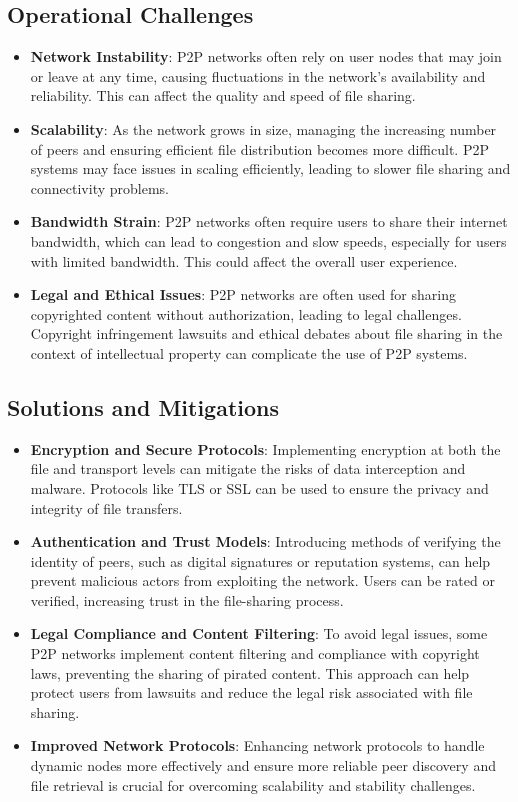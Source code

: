 \subsection{Operational Challenges}

\begin{itemize}
    \item \textbf{Network Instability}: P2P networks often rely on user nodes that may join or leave at any time, causing fluctuations in the network’s availability and reliability. This can affect the quality and speed of file sharing.
    \item \textbf{Scalability}: As the network grows in size, managing the increasing number of peers and ensuring efficient file distribution becomes more difficult. P2P systems may face issues in scaling efficiently, leading to slower file sharing and connectivity problems.
    \item \textbf{Bandwidth Strain}: P2P networks often require users to share their internet bandwidth, which can lead to congestion and slow speeds, especially for users with limited bandwidth. This could affect the overall user experience.
    \item \textbf{Legal and Ethical Issues}: P2P networks are often used for sharing copyrighted content without authorization, leading to legal challenges. Copyright infringement lawsuits and ethical debates about file sharing in the context of intellectual property can complicate the use of P2P systems.
\end{itemize}

\subsection{Solutions and Mitigations}
\begin{itemize}
    \item \textbf{Encryption and Secure Protocols}: Implementing encryption at both the file and transport levels can mitigate the risks of data interception and malware. Protocols like TLS or SSL can be used to ensure the privacy and integrity of file transfers.
    \item \textbf{Authentication and Trust Models}: Introducing methods of verifying the identity of peers, such as digital signatures or reputation systems, can help prevent malicious actors from exploiting the network. Users can be rated or verified, increasing trust in the file-sharing process.
    \item \textbf{Legal Compliance and Content Filtering}: To avoid legal issues, some P2P networks implement content filtering and compliance with copyright laws, preventing the sharing of pirated content. This approach can help protect users from lawsuits and reduce the legal risk associated with file sharing.
    \item \textbf{Improved Network Protocols}: Enhancing network protocols to handle dynamic nodes more effectively and ensure more reliable peer discovery and file retrieval is crucial for overcoming scalability and stability challenges.
\end{itemize}


